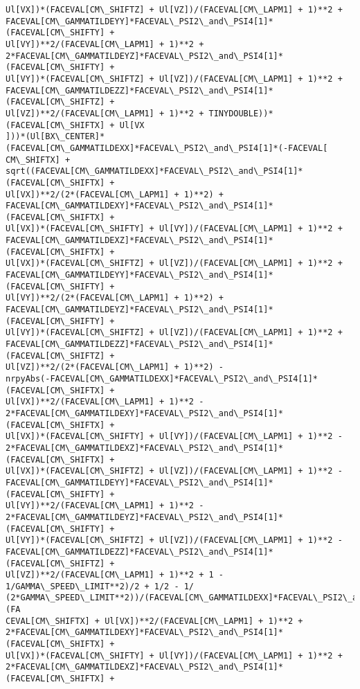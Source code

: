 \documentclass[landscape,letterpaper,10pt,english]{article}
\begin{document}
\begin{Verbatim}[commandchars=\\\{\}]
Ul[VX])*(FACEVAL[CM\_SHIFTZ] + Ul[VZ])/(FACEVAL[CM\_LAPM1] + 1)**2 +
FACEVAL[CM\_GAMMATILDEYY]*FACEVAL\_PSI2\_and\_PSI4[1]*(FACEVAL[CM\_SHIFTY] +
Ul[VY])**2/(FACEVAL[CM\_LAPM1] + 1)**2 +
2*FACEVAL[CM\_GAMMATILDEYZ]*FACEVAL\_PSI2\_and\_PSI4[1]*(FACEVAL[CM\_SHIFTY] +
Ul[VY])*(FACEVAL[CM\_SHIFTZ] + Ul[VZ])/(FACEVAL[CM\_LAPM1] + 1)**2 +
FACEVAL[CM\_GAMMATILDEZZ]*FACEVAL\_PSI2\_and\_PSI4[1]*(FACEVAL[CM\_SHIFTZ] +
Ul[VZ])**2/(FACEVAL[CM\_LAPM1] + 1)**2 + TINYDOUBLE))*(FACEVAL[CM\_SHIFTX] + Ul[VX
]))*(Ul[BX\_CENTER]*(FACEVAL[CM\_GAMMATILDEXX]*FACEVAL\_PSI2\_and\_PSI4[1]*(-FACEVAL[
CM\_SHIFTX] +
sqrt((FACEVAL[CM\_GAMMATILDEXX]*FACEVAL\_PSI2\_and\_PSI4[1]*(FACEVAL[CM\_SHIFTX] +
Ul[VX])**2/(2*(FACEVAL[CM\_LAPM1] + 1)**2) +
FACEVAL[CM\_GAMMATILDEXY]*FACEVAL\_PSI2\_and\_PSI4[1]*(FACEVAL[CM\_SHIFTX] +
Ul[VX])*(FACEVAL[CM\_SHIFTY] + Ul[VY])/(FACEVAL[CM\_LAPM1] + 1)**2 +
FACEVAL[CM\_GAMMATILDEXZ]*FACEVAL\_PSI2\_and\_PSI4[1]*(FACEVAL[CM\_SHIFTX] +
Ul[VX])*(FACEVAL[CM\_SHIFTZ] + Ul[VZ])/(FACEVAL[CM\_LAPM1] + 1)**2 +
FACEVAL[CM\_GAMMATILDEYY]*FACEVAL\_PSI2\_and\_PSI4[1]*(FACEVAL[CM\_SHIFTY] +
Ul[VY])**2/(2*(FACEVAL[CM\_LAPM1] + 1)**2) +
FACEVAL[CM\_GAMMATILDEYZ]*FACEVAL\_PSI2\_and\_PSI4[1]*(FACEVAL[CM\_SHIFTY] +
Ul[VY])*(FACEVAL[CM\_SHIFTZ] + Ul[VZ])/(FACEVAL[CM\_LAPM1] + 1)**2 +
FACEVAL[CM\_GAMMATILDEZZ]*FACEVAL\_PSI2\_and\_PSI4[1]*(FACEVAL[CM\_SHIFTZ] +
Ul[VZ])**2/(2*(FACEVAL[CM\_LAPM1] + 1)**2) -
nrpyAbs(-FACEVAL[CM\_GAMMATILDEXX]*FACEVAL\_PSI2\_and\_PSI4[1]*(FACEVAL[CM\_SHIFTX] +
Ul[VX])**2/(FACEVAL[CM\_LAPM1] + 1)**2 -
2*FACEVAL[CM\_GAMMATILDEXY]*FACEVAL\_PSI2\_and\_PSI4[1]*(FACEVAL[CM\_SHIFTX] +
Ul[VX])*(FACEVAL[CM\_SHIFTY] + Ul[VY])/(FACEVAL[CM\_LAPM1] + 1)**2 -
2*FACEVAL[CM\_GAMMATILDEXZ]*FACEVAL\_PSI2\_and\_PSI4[1]*(FACEVAL[CM\_SHIFTX] +
Ul[VX])*(FACEVAL[CM\_SHIFTZ] + Ul[VZ])/(FACEVAL[CM\_LAPM1] + 1)**2 -
FACEVAL[CM\_GAMMATILDEYY]*FACEVAL\_PSI2\_and\_PSI4[1]*(FACEVAL[CM\_SHIFTY] +
Ul[VY])**2/(FACEVAL[CM\_LAPM1] + 1)**2 -
2*FACEVAL[CM\_GAMMATILDEYZ]*FACEVAL\_PSI2\_and\_PSI4[1]*(FACEVAL[CM\_SHIFTY] +
Ul[VY])*(FACEVAL[CM\_SHIFTZ] + Ul[VZ])/(FACEVAL[CM\_LAPM1] + 1)**2 -
FACEVAL[CM\_GAMMATILDEZZ]*FACEVAL\_PSI2\_and\_PSI4[1]*(FACEVAL[CM\_SHIFTZ] +
Ul[VZ])**2/(FACEVAL[CM\_LAPM1] + 1)**2 + 1 - 1/GAMMA\_SPEED\_LIMIT**2)/2 + 1/2 - 1/
(2*GAMMA\_SPEED\_LIMIT**2))/(FACEVAL[CM\_GAMMATILDEXX]*FACEVAL\_PSI2\_and\_PSI4[1]*(FA
CEVAL[CM\_SHIFTX] + Ul[VX])**2/(FACEVAL[CM\_LAPM1] + 1)**2 +
2*FACEVAL[CM\_GAMMATILDEXY]*FACEVAL\_PSI2\_and\_PSI4[1]*(FACEVAL[CM\_SHIFTX] +
Ul[VX])*(FACEVAL[CM\_SHIFTY] + Ul[VY])/(FACEVAL[CM\_LAPM1] + 1)**2 +
2*FACEVAL[CM\_GAMMATILDEXZ]*FACEVAL\_PSI2\_and\_PSI4[1]*(FACEVAL[CM\_SHIFTX] +

\end{Verbatim}
\end{document}
